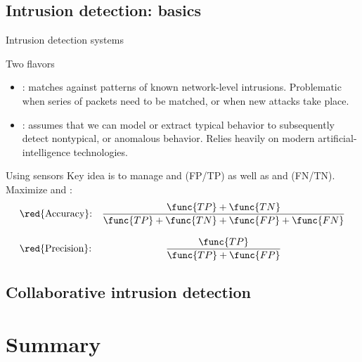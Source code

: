 \subsection{Intrusion detection: basics}
\begin{slide}{Intrusion detection systems}
  \begin{block}{Two flavors}
    \begin{itemize}
    \item {}: matches against patterns of known network-level intrusions. Problematic when
      series of packets need to be matched, or when new attacks take place.
    \item {}: assumes that we can model or extract typical behavior to subsequently detect
      nontypical, or anomalous behavior. Relies heavily on modern artificial-intelligence technologies.
    \end{itemize}
  \end{block}

  \begin{block}{Using sensors}
    Key idea is to manage  and  (FP/TP) as well as  and
     (FN/TN). Maximize  and :
    \[
    \begin{array}{lc}
      \mbox{\red{Accuracy}:}  & \displaystyle\frac{\func{TP} +
        \func{TN}}{\func{TP}+\func{TN}+\func{FP}+\func{FN}} \\ \ \\
      \mbox{\red{Precision}:} & \displaystyle\frac{\func{TP}}{\func{TP}+\func{FP}} \\ 
    \end{array}
    \]
  \end{block}
\end{slide}
\subsection{Collaborative intrusion detection}
\section{Summary}
